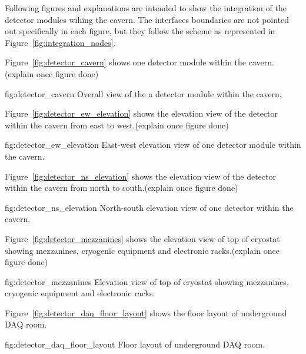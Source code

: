 Following figures and explanations are intended to show the
integration of the detector modules wihing the cavern. The interfaces
boundaries are not pointed out specifically in each figure, but they
follow the scheme as represented in
Figure~\ref{fig:integration_nodes}.

Figure~\ref{fig:detector_cavern} shows one detector module within the cavern. (explain once figure done)
\begin{dunefigure}{fig:detector_cavern}
  {Overall view of the a detector module within the cavern.}
\end{dunefigure}

Figure~\ref{fig:detector_ew_elevation} shows the elevation view of the
detector within the cavern from east to west.(explain once figure done)
\begin{dunefigure}{fig:detector_ew_elevation}
  {East-west elevation view of one detector module within the cavern.}
\end{dunefigure}

Figure~\ref{fig:detector_ns_elevation} shows the elevation view of the
detector within the cavern from north to south.(explain once figure done)
\begin{dunefigure}{fig:detector_ns_elevation}
  {North-south elevation view of one detector within the cavern.}
\end{dunefigure}



Figure~\ref{fig:detector_mezzanines} shows the elevation view of top
of cryostat showing mezzanines, cryogenic equipment and electronic
racks.(explain once figure done)
\begin{dunefigure}{fig:detector_mezzanines}
  {Elevation view of top of cryostat showing mezzanines, cryogenic
    equipment and electronic racks.}
\end{dunefigure}

Figure~\ref{fig:detector_daq_floor_layout} shows the floor layout of underground DAQ room.
\begin{dunefigure}{fig:detector_daq_floor_layout}
  {Floor layout of underground DAQ room.}
\end{dunefigure}

